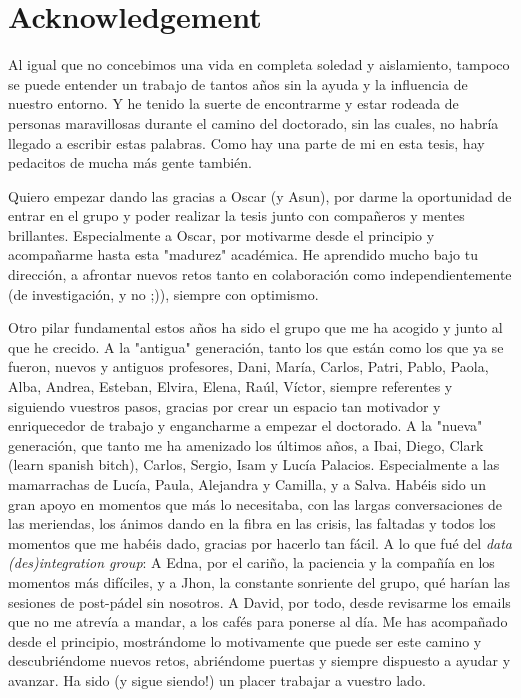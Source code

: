 %
\section*{Acknowledgement}
\label{sec::acknowledgement}


Al igual que no concebimos una vida en completa soledad y aislamiento, tampoco se puede entender un trabajo de tantos años sin la ayuda y la influencia de nuestro entorno. Y he tenido la suerte de encontrarme y estar rodeada de personas maravillosas durante el camino del doctorado, sin las cuales, no habría llegado a escribir estas palabras. Como hay una parte de mi en esta tesis, hay pedacitos de mucha más gente también.

Quiero empezar dando las gracias a Oscar (y Asun), por darme la oportunidad de entrar en el grupo y poder realizar la tesis junto con compañeros y mentes brillantes. Especialmente a Oscar, por motivarme desde el principio y acompañarme hasta esta "madurez" académica. He aprendido mucho bajo tu dirección, a afrontar nuevos retos tanto en colaboración como independientemente (de investigación, y no ;)), siempre con optimismo.  

Otro pilar fundamental estos años ha sido el grupo que me ha acogido y junto al que he crecido. A la "antigua" generación, tanto los que están como los que ya se fueron, nuevos y antiguos profesores, Dani, María, Carlos, Patri, Pablo, Paola, Alba, Andrea, Esteban, Elvira, Elena, Raúl, Víctor, siempre referentes y siguiendo vuestros pasos, gracias por crear un espacio tan motivador y enriquecedor de trabajo y engancharme a empezar el doctorado. 
A la "nueva" generación, que tanto me ha amenizado los últimos años, a Ibai, Diego, Clark (learn spanish bitch), Carlos, Sergio, Isam y Lucía Palacios. Especialmente a las mamarrachas de Lucía, Paula, Alejandra y Camilla, y a Salva. Habéis sido un gran apoyo en momentos que más lo necesitaba, con las largas conversaciones de las meriendas, los ánimos dando en la fibra en las crisis, las faltadas y todos los momentos que me habéis dado, gracias por hacerlo tan fácil.
A lo que fué del \textit{data (des)integration group}: 
A Edna, por el cariño, la paciencia y la compañía en los momentos más difíciles, y a Jhon, la constante sonriente del grupo, qué harían las sesiones de post-pádel sin nosotros.
A David, por todo, desde revisarme los emails que no me atrevía a mandar, a los cafés para ponerse al día. Me has acompañado desde el principio, mostrándome lo motivamente que puede ser este camino y descubriéndome nuevos retos, abriéndome puertas y siempre dispuesto a ayudar y avanzar. Ha sido (y sigue siendo!) un placer trabajar a vuestro lado.

